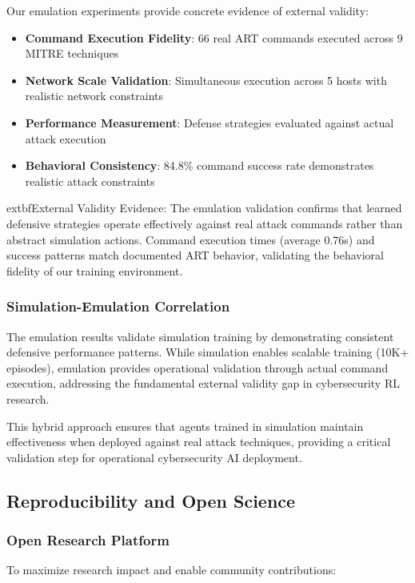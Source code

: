 \documentclass[12pt]{article}
\theoremstyle{definition}
\theoremstyle{plain}
\begin{document}
Our emulation experiments provide concrete evidence of external validity:

\begin{itemize}
    \item \textbf{Command Execution Fidelity}: 66 real ART commands executed across 9 MITRE techniques
    \item \textbf{Network Scale Validation}: Simultaneous execution across 5 hosts with realistic network constraints
    \item \textbf{Performance Measurement}: Defense strategies evaluated against actual attack execution
    \item \textbf{Behavioral Consistency}: 84.8\% command success rate demonstrates realistic attack constraints
\end{itemize}

	extbf{External Validity Evidence}: The emulation validation confirms that learned defensive strategies operate effectively against real attack commands rather than abstract simulation actions. Command execution times (average 0.76s) and success patterns match documented ART behavior, validating the behavioral fidelity of our training environment.

\subsubsection{Simulation-Emulation Correlation}

The emulation results validate simulation training by demonstrating consistent defensive performance patterns. While simulation enables scalable training (10K+ episodes), emulation provides operational validation through actual command execution, addressing the fundamental external validity gap in cybersecurity RL research.

This hybrid approach ensures that agents trained in simulation maintain effectiveness when deployed against real attack techniques, providing a critical validation step for operational cybersecurity AI deployment.

\subsection{Reproducibility and Open Science}

\subsubsection{Open Research Platform}
To maximize research impact and enable community contributions:
\end{document}
